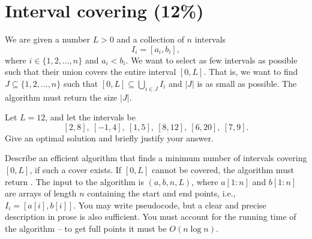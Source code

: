 \section{Interval covering (12\%)}

We are given a number $L>0$ and a collection of $n$ intervals
\[
I_i=[a_i,b_i],
\]
where $i\in\{1,2,\ldots,n\}$ and $a_i < b_i$.
We want to select as few intervals as possible such that their union covers the entire interval $[0,L]$.
That is, we want to find $J\subseteq\{1,2,\ldots,n\}$ such that $[0,L]\subseteq\bigcup_{i\in J} I_i$ and $\vert J\vert$ is as small as possible.
The algorithm must return the size $\vert J\vert$.

{Let $L=12$, and let the intervals be
\[
[2,8],\ [-1,4],\ [1,5],\ [8,12],\ [6,20],\ [7,9].
\]
Give an optimal solution and briefly justify your answer.}



{Describe an efficient algorithm that finds a minimum number of intervals covering $[0,L]$, if such a cover exists.
If $[0,L]$ cannot be covered, the algorithm must return .
The input to the algorithm is $(a,b,n,L)$, where $a[1{:}n]$ and $b[1{:}n]$ are arrays of length $n$ containing the start and end points, i.e.,~$I_i=[a[i],b[i]]$.
You may write pseudocode, but a clear and precise description in prose is also sufficient.
You must account for the running time of the algorithm -- to get full points it must be $O(n\log n)$.}

